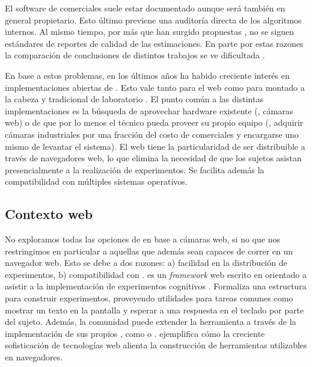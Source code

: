 El software de \eyetrackers comerciales suele estar documentado aunque será
también en general propietario.
Esto último previene una auditoría directa de los algoritmos internos.
Al mismo tiempo, por más que han surgido propuestas
\cite{antoniades_2013_standarized_protocol}, no se siguen estándares de
reportes de calidad de las estimaciones.
En parte por estas razones la comparación de conclusiones de distintos trabajos
se ve dificultada \cite{zandi_2021_pupilext,
salvucci_2000_identifying_fixations}.

En base a estos problemas, en los últimos años ha habido creciente interés en
implementaciones abiertas de \eyetrackers.
Esto vale tanto para el \eyetracking web \cite{xu_2015_turker_gaze,
papoutsaki_2016_webgazer} como para \eyetracking montado a la cabeza
\cite{santini_2017_eyerectoo} y \eyetracking tradicional de laboratorio
\cite{zandi_2021_pupilext}.
El punto común a las distintas implementaciones es la búsqueda de aprovechar
hardware existente (\eg, cámaras web) o de que por lo menos el técnico pueda
proveer su propio equipo (\ie, adquirir cámaras industriales por una fracción
del costo de \eyetrackers comerciales y encargarse uno mismo de levantar el
sistema).
El \eyetracking web tiene la particularidad de ser distribuible a través de
navegadores web, lo que elimina la necesidad de que los sujetos asistan
presencialmente a la realización de experimentos.
Se facilita además la compatibilidad con múltiples sistemas operativos.

\subsection{Contexto web}

No exploramos todas las opciones de \eyetracking en base a cámaras web, si no
que nos restringimos en particular a aquellas que además sean capaces de correr
en un navegador web.
Esto se debe a dos razones:
a) facilidad en la distribución de experimentos,
b) compatibilidad con \jspsych.
\jspsych es un \textit{framework} web escrito en \js orientado a asistir a la
implementación de experimentos cognitivos \cite{joshua_2015_jspsych}.
Formaliza una estructura para construir experimentos, proveyendo utilidades
para tareas comunes como mostrar un texto en la pantalla y esperar a una
respuesta en el teclado por parte del sujeto.
Además, la comunidad puede extender la herramienta a través de la
implementación de sus propios \plugin, como \psychophysics
\cite{kuroki_2021_psycho_physics} o \virtualchinrest
\cite{li_2020_virtual_chinrest}.
\jspsych ejemplifica cómo la creciente sofisticación de tecnologías web alienta
la construcción de herramientas utilizables en navegadores.

